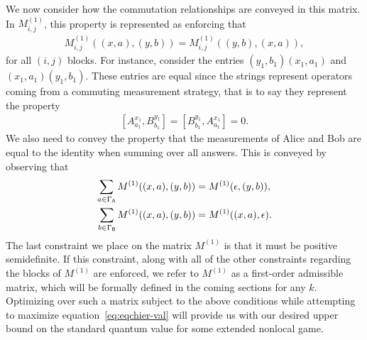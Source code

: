 We now consider how the commutation relationships are conveyed in this matrix. In $M_{i,j}^{(1)}$, this property is represented as enforcing that 
\begin{align}
	M^{(1)}_{i,j}((x,a),(y,b)) = M^{(1)}_{i,j}((y,b),(x,a)),
\end{align}
for all $(i,j)$ blocks. For instance, consider the entries $(y_1,b_1)(x_1,a_1)$ and $(x_1,a_1)(y_1,b_1)$. These entries are equal since the strings represent operators coming from a commuting measurement strategy, that is to say they represent the property 
\begin{align}
	\left[A_{a_1}^{x_1}, B_{b_1}^{y_1} \right] = \left[ B_{b_1}^{y_1}, A_{a_1}^{x_1} \right] = 0.
\end{align}
We also need to convey the property that the measurements of Alice and Bob are equal to the identity when summing over all answers. This is conveyed by observing that
\begin{equation}
	\begin{aligned}
		\sum_{a \in \Gamma_{\mathsf{A}}} M^{(1)}((x,a),(y,b)) &= M^{(1)}(\epsilon,(y,b)), \\
		\sum_{b \in \Gamma_{\mathsf{B}}} M^{(1)}((x,a),(y,b)) &= M^{(1)}((x,a),\epsilon).
	\end{aligned}
\end{equation}
The last constraint we place on the matrix $M^{(1)}$ is that it must be positive semidefinite. If this constraint, along with all of the other constraints regarding the blocks of $M^{(1)}$ are enforced, we refer to $M^{(1)}$ as a first-order admissible matrix, which will be formally defined in the coming sections for any $k$. Optimizing over such a matrix subject to the above conditions while attempting to maximize equation~\eqref{eq:eqchier-val} will provide us with our desired upper bound on the standard quantum value for some extended nonlocal game. 

